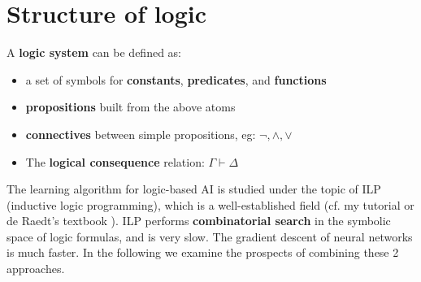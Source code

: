 \documentclass[orivec]{llncs}
\newcommand*\KB{\raisebox{-.2\height}{\texttt{[image: KB-symbol.png]}}}
\begin{document}
\section{Structure of logic}

A \textbf{logic system} can be defined as:
\let\labelitemi\labelitemii
\begin{itemize}
\item a set of symbols for \textbf{constants}, \textbf{predicates}, and \textbf{functions}
\item \textbf{propositions} built from the above atoms
\item \textbf{connectives} between simple propositions, eg:  $\neg, \wedge, \vee$
\item The \textbf{logical consequence} relation: $\Gamma \vdash \Delta$
\end{itemize}

The learning algorithm for logic-based AI is studied under the topic of ILP (inductive logic programming), which is a well-established field (cf. my tutorial \cite{YanILPtutorial} or de Raedt's textbook \cite{DeRaedt2008}).  ILP performs \textbf{combinatorial search} in the symbolic space of logic formulas, and is very slow.  The gradient descent of neural networks is much faster.  In the following we examine the prospects of combining these 2 approaches.


\end{document}
